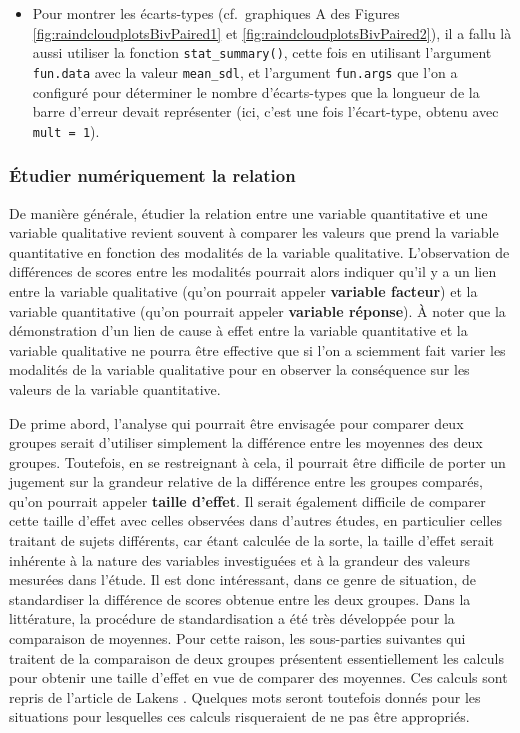 \documentclass[
  french,
]{book}
\begin{document}
\begin{itemize}
\item
  Pour montrer les écarts-types (cf.~graphiques A des Figures \ref{fig:raindcloudplotsBivPaired1} et \ref{fig:raindcloudplotsBivPaired2}), il a fallu là aussi utiliser la fonction \texttt{stat\_summary()}, cette fois en utilisant l'argument \texttt{fun.data} avec la valeur \texttt{mean\_sdl}, et l'argument \texttt{fun.args} que l'on a configuré pour déterminer le nombre d'écarts-types que la longueur de la barre d'erreur devait représenter (ici, c'est une fois l'écart-type, obtenu avec \texttt{mult\ =\ 1}).
\end{itemize}

\hypertarget{uxe9tudier-numuxe9riquement-la-relation-2}{%
\subsubsection{Étudier numériquement la relation}\label{uxe9tudier-numuxe9riquement-la-relation-2}}

De manière générale, étudier la relation entre une variable quantitative et une variable qualitative revient souvent à comparer les valeurs que prend la variable quantitative en fonction des modalités de la variable qualitative. L'observation de différences de scores entre les modalités pourrait alors indiquer qu'il y a un lien entre la variable qualitative (qu'on pourrait appeler \textbf{variable facteur}) et la variable quantitative (qu'on pourrait appeler \textbf{variable réponse}). À noter que la démonstration d'un lien de cause à effet entre la variable quantitative et la variable qualitative ne pourra être effective que si l'on a sciemment fait varier les modalités de la variable qualitative pour en observer la conséquence sur les valeurs de la variable quantitative.

De prime abord, l'analyse qui pourrait être envisagée pour comparer deux groupes serait d'utiliser simplement la différence entre les moyennes des deux groupes. Toutefois, en se restreignant à cela, il pourrait être difficile de porter un jugement sur la grandeur relative de la différence entre les groupes comparés, qu'on pourrait appeler \textbf{taille d'effet}. Il serait également difficile de comparer cette taille d'effet avec celles observées dans d'autres études, en particulier celles traitant de sujets différents, car étant calculée de la sorte, la taille d'effet serait inhérente à la nature des variables investiguées et à la grandeur des valeurs mesurées dans l'étude. Il est donc intéressant, dans ce genre de situation, de standardiser la différence de scores obtenue entre les deux groupes. Dans la littérature, la procédure de standardisation a été très développée pour la comparaison de moyennes. Pour cette raison, les sous-parties suivantes qui traitent de la comparaison de deux groupes présentent essentiellement les calculs pour obtenir une taille d'effet en vue de comparer des moyennes. Ces calculs sont repris de l'article de Lakens \autocite*{lakensCalculatingReportingEffect2013}. Quelques mots seront toutefois donnés pour les situations pour lesquelles ces calculs risqueraient de ne pas être appropriés.
\end{document}
